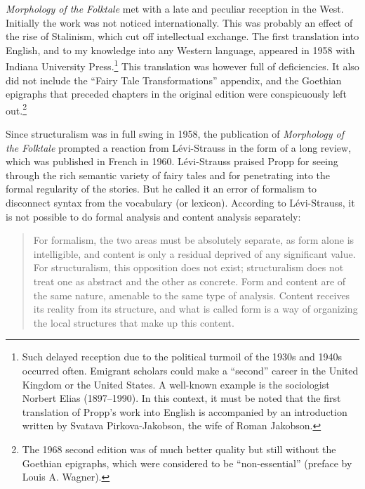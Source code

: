 \documentclass[output=paper]{langscibook}
\begin{document}
\emph{Morphology of the Folktale} met with a late and peculiar reception in the West. Initially the work was not noticed internationally. This was probably an effect of the rise of Stalinism, which cut off intellectual exchange. The first translation into English, and to my knowledge into any Western language, appeared in 1958 with Indiana University Press.\footnote{Such delayed reception due to the political turmoil of the 1930s and 1940s occurred often. Emigrant scholars could make a ``second'' career in the United Kingdom or the United States. A well-known example is the sociologist Norbert Elias (1897--1990). In this context, it must be noted that the first translation of Propp's work into English is accompanied by an introduction written by Svatava Pirkova-Jakobson, the wife of Roman Jakobson.} This translation was however full of deficiencies. It also did not include the ``Fairy Tale Transformations'' appendix, and the Goethian epigraphs that preceded chapters in the original edition were conspicuously left out.\footnote{The 1968 second edition was of much better quality but still without the Goethian epigraphs, which were considered to be ``non-essential'' (preface by Louis A. Wagner).} 

Since structuralism was in full swing in 1958, the publication of \emph{Morphology of the Folktale} prompted a reaction from Lévi-Strauss in the form of a long review, which was published in French in 1960. Lévi-Strauss praised Propp for seeing through the rich semantic variety of fairy tales and for penetrating into the formal regularity of the stories. But he called it an error of formalism to disconnect syntax from the vocabulary (or lexicon). According to Lévi-Strauss, it is not possible to do formal analysis and content analysis separately: 

\begin{quotation}
For formalism, the two areas must be absolutely separate, as form alone is intelligible, and content is only a residual deprived of any significant value. For structuralism, this opposition does not exist; structuralism does not treat one as abstract and the other as concrete. Form and content are of the same nature, amenable to the same type of analysis. Content receives its reality from its structure, and what is called form is a way of organizing the local structures that make up this content. \citep[179]{Levi-Strauss1984}
\end{quotation}
\end{document}
